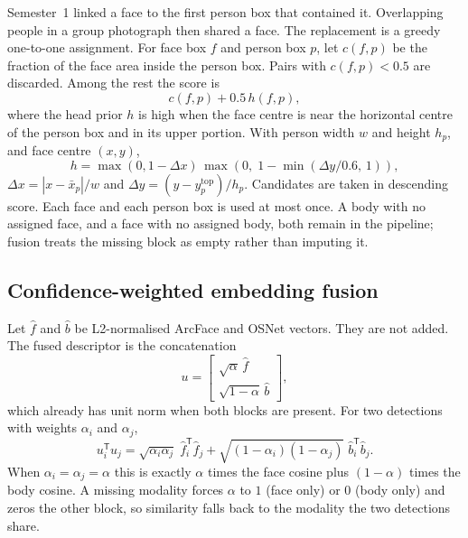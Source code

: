 \documentclass[conference]{IEEEtran}
\begin{document}
Semester~1 linked a face to the first person box that contained it. Overlapping
people in a group photograph then shared a face. The replacement is a greedy
one-to-one assignment. For face box $f$ and person box $p$, let $c(f,p)$ be
the fraction of the face area inside the person box. Pairs with
$c(f,p)<0.5$ are discarded. Among the rest the score is
\begin{equation}
c(f,p) + 0.5\, h(f,p),
\label{eq:match}
\end{equation}
where the head prior $h$ is high when the face centre is near the horizontal
centre of the person box and in its upper portion. With person width $w$ and
height $h_p$, and face centre $(x,y)$,
\begin{equation}
h = \max(0, 1-\Delta x)\,
    \max\!\left(0,\; 1-\min(\Delta y/0.6,\, 1)\right),
\end{equation}
$\Delta x = |x - \bar{x}_p|/w$ and $\Delta y = (y - y^{\mathrm{top}}_p)/h_p$.
Candidates are taken in descending score. Each face and each person box is used
at most once. A body with no assigned face, and a face with no assigned body,
both remain in the pipeline; fusion treats the missing block as empty rather
than imputing it.

\subsection{Confidence-weighted embedding fusion}
\label{sec:fusion}

Let $\hat{f}$ and $\hat{b}$ be L2-normalised ArcFace and OSNet vectors. They
are not added. The fused descriptor is the concatenation
\begin{equation}
u =
\begin{bmatrix}
\sqrt{\alpha}\,\hat{f}\\[2pt]
\sqrt{1-\alpha}\,\hat{b}
\end{bmatrix},
\label{eq:fuse}
\end{equation}
which already has unit norm when both blocks are present. For two detections
with weights $\alpha_i$ and $\alpha_j$,
\begin{equation}
u_i^{\mathsf T} u_j
=
\sqrt{\alpha_i\alpha_j}\;
\hat{f}_i^{\mathsf T}\hat{f}_j
+
\sqrt{(1-\alpha_i)(1-\alpha_j)}\;
\hat{b}_i^{\mathsf T}\hat{b}_j.
\label{eq:cos}
\end{equation}
When $\alpha_i=\alpha_j=\alpha$ this is exactly
$\alpha$ times the face cosine plus $(1-\alpha)$ times the body cosine. A
missing modality forces $\alpha$ to $1$ (face only) or $0$ (body only) and
zeros the other block, so similarity falls back to the modality the two
detections share.
\end{document}
